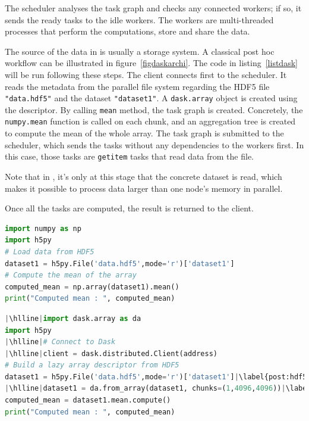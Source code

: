 The scheduler analyses the task graph and checks any connected workers; if so, it sends the ready tasks to the idle workers. The workers are multi-threaded processes that perform the computations, store and share the data. 

The source of the data in \dask is usually a storage system. A classical post hoc workflow can be illustrated in figure~\ref{figdaskarchi}. The code in listing~\ref{listdask} will be run following these steps. The client connects first to the scheduler. It reads the metadata from the parallel file system regarding the HDF5 file \texttt{"data.hdf5"} and the dataset \texttt{"dataset1"}. A \texttt{dask.array} object is created using the descriptor. By calling \texttt{mean} method, the task graph is created. Concretely, the \texttt{numpy.mean} function is called on each chunk, and an aggregation tree is created to compute the mean of the whole array. The task graph is submitted to the scheduler, which sends the tasks without any dependencies to the workers first. In this case, those tasks are \texttt{getitem} tasks that read data from the file. 

Note that in \dask, it's only at this stage that the concrete dataset is read, which makes it possible to process data larger than one node's memory in parallel.

Once all the tasks are computed, the result is returned to the client.

\begin{lstlisting}[float, label=listnumpy, language=python, caption=Sequential post hoc mean using numpy]
import numpy as np
import h5py
# Load data from HDF5
dataset1 = h5py.File('data.hdf5',mode='r')['dataset1']
# Compute the mean of the array
computed_mean = np.array(dataset1).mean()
print("Computed mean : ", computed_mean)
\end{lstlisting}

\begin{lstlisting}[float, label=listdask, language=python, caption=Parallel post hoc mean with \dask. Lines differing from the analysis of Listing~\ref{listnumpy} are highlighted]
|\hlline|import dask.array as da
import h5py
|\hlline|# Connect to Dask
|\hlline|client = dask.distributed.Client(address)
# Build a lazy array descriptor from HDF5
dataset1 = h5py.File('data.hdf5',mode='r')['dataset1']|\label{post:hdf5}|
|\hlline|dataset1 = da.from_array(dataset1, chunks=(1,4096,4096))|\label{post:chunk}|
computed_mean = dataset1.mean.compute()
print("Computed mean : ", computed_mean)
\end{lstlisting}

